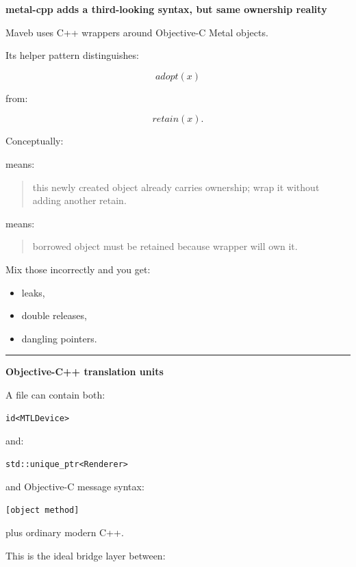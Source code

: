 \textbf{metal-cpp adds a third-looking syntax, but same ownership reality}

Maveb uses C++ wrappers around Objective-C Metal objects.

Its helper pattern distinguishes:

\[
adopt(x)
\]

from:

\[
retain(x).
\]

Conceptually:

 means:

\begin{quote}
this newly created object already carries ownership; wrap it without adding another retain.
\end{quote}

 means:

\begin{quote}
borrowed object must be retained because wrapper will own it.
\end{quote}

Mix those incorrectly and you get:

\begin{itemize}
\tightlist
\item
  leaks,
\item
  double releases,
\item
  dangling pointers.
\end{itemize}

\begin{center}\rule{0.5\linewidth}{0.5pt}\end{center}

\textbf{Objective-C++  translation units}

A  file can contain both:

\begin{verbatim}
id<MTLDevice>
\end{verbatim}

and:

\begin{verbatim}
std::unique_ptr<Renderer>
\end{verbatim}

and Objective-C message syntax:

\begin{verbatim}
[object method]
\end{verbatim}

plus ordinary modern C++.

This is the ideal bridge layer between:

